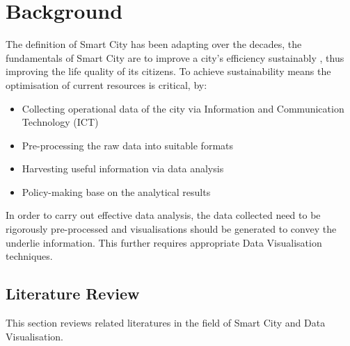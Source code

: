 \documentclass[11pt,a4paper]{article}
\begin{document}
%

\section{Background}
\label{sec2}
The definition of Smart City has been adapting over the decades, the fundamentals of Smart City are to improve a city's efficiency sustainably \parencite{Caragliu2011}, thus improving the life quality of its citizens. To achieve sustainability means the optimisation of current resources is critical, by:
\begin{itemize}
	\item Collecting operational data of the city via Information and Communication Technology (ICT) \parencite{Deakin2011}
	\item Pre-processing the raw data into suitable formats
	\item Harvesting useful information via data analysis
	\item Policy-making base on the analytical results \parencite{Lazaroiu2012}
\end{itemize}
In order to carry out effective data analysis, the data collected need to be rigorously pre-processed and visualisations should be generated to convey the underlie information. This further requires appropriate Data Visualisation techniques.

\subsection{Literature Review}
This section reviews related literatures in the field of Smart City and Data Visualisation.
\end{document}
